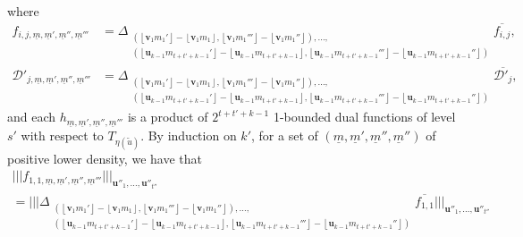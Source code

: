\documentclass[11pt]{amsart}
\theoremstyle{definition}
\newcommand{\CD}{{\mathcal D}}
\newcommand{\bu}{{\mathbf{u}}}
\newcommand{\bv}{{\mathbf{v}}}
\newcommand{\um}{{\underline{m}}}
\newcommand{\nnorm}[1]{\lvert\!|\!| #1|\!|\!\rvert}
\newcommand{\Bignnorm}[1]{\Big|\!\Big|\!\Big| #1\Big|\!\Big|\!\Big|}
\newcommand{\1}{{\mathbf{1}}}
\newcommand{\floor}[1]{{\left \lfloor #1 \right \rfloor}}
\begin{document}
        where
        \begin{align*}
            f_{i,j,\um,\um',\um'',\um'''} &= \Delta_{\substack{(\floor{\bv_1 m_1'} - \floor{\bv_1 m_1}, \floor{\bv_1 m_1'''} - \floor{\bv_1 m_1''}), \ldots,\\ (\floor{\bu_{k-1} m_{t+t'+k-1}'} - \floor{\bu_{k-1} m_{t+t'+k-1}}, \floor{\bu_{k-1} m_{t+t'+k-1}'''} - \floor{\bu_{k-1} m_{t+t'+k-1}''})}}\overline{f_{i,j}},\\
            \CD'_{j,\um,\um',\um'',\um'''} &= \Delta_{\substack{(\floor{\bv_1 m_1'} - \floor{\bv_1 m_1}, \floor{\bv_1 m_1'''} - \floor{\bv_1 m_1''}), \ldots,\\ (\floor{\bu_{k-1} m_{t+t'+k-1}'} - \floor{\bu_{k-1} m_{t+t'+k-1}}, \floor{\bu_{k-1} m_{t+t'+k-1}'''} - \floor{\bu_{k-1} m_{t+t'+k-1}''})}}\overline{\CD'_{j}},
        \end{align*}
    and each $h_{\um,\um',\um'',\um'''}$ is a product of $2^{t+t'+k-1}$ 1-bounded dual functions of level $s'$ with respect to $T_{\eta(\tilde{u})}$.
       By induction on $k'$,  for a set of $(\um,\um',\um'',\um'')$ of positive lower density, we have that
       \begin{multline*}
           \nnorm{f_{1,1,\um,\um',\um'',\um'''}}_{\bu''_{1},\dots,\bu''_{t''}}\\
           =\Bignnorm{\Delta_{\substack{(\floor{\bv_1 m_1'} - \floor{\bv_1 m_1}, \floor{\bv_1 m_1'''} - \floor{\bv_1 m_1''}), \ldots,\\ (\floor{\bu_{k-1} m_{t+t'+k-1}'} - \floor{\bu_{k-1} m_{t+t'+k-1}}, \floor{\bu_{k-1} m_{t+t'+k-1}'''} - \floor{\bu_{k-1} m_{t+t'+k-1}''})}}\overline{f_{1,1}}}_{\bu''_{1},\dots,\bu''_{t''}}
       \end{multline*}
\end{document}
